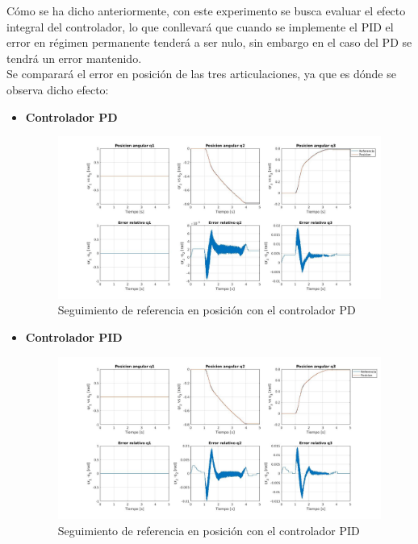 Cómo se ha dicho anteriormente, con este experimento se busca evaluar el efecto integral del controlador, lo que conllevará que cuando se implemente el PID el error en régimen permanente tenderá a ser nulo, sin embargo en el caso del PD se tendrá un error mantenido.\\

Se comparará el error en posición de las tres articulaciones, ya que es dónde se observa dicho efecto:

\begin{itemize}
	\newpage
	\item \textbf{Controlador PD}
	
	
	
	\begin{figure}[h!]
		
		\centering
		
		\includegraphics[width=.8\textwidth]{exp1_posPD}
		
		\caption{Seguimiento de referencia en posición con el controlador PD}
		
	\end{figure}
	
	

	
	\item \textbf{Controlador PID}
	
	\begin{figure}[h!]
		
		\centering
		
		\includegraphics[width=.8\textwidth]{exp1_posPID}
		
		\caption{Seguimiento de referencia en posición con el controlador PID}
		
	\end{figure}
	
	
	
\end{itemize}



